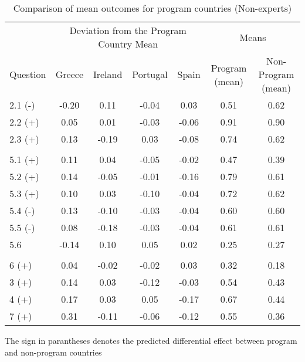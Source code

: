 
\begin{table}[htbp]\centering
\def\sym#1{\ifmmode^{#1}\else\(^{#1}\)\fi}
\caption{Comparison of mean outcomes for program countries (Non-experts)}
\begin{tabular}{l*{6}{c}}
\hline\hline
&\multicolumn{4}{c}{Deviation from the Program Country Mean} &\multicolumn{2}{c}{Means} \\
           Question &\multicolumn{1}{c}{Greece}&\multicolumn{1}{c}{Ireland}&\multicolumn{1}{c}{Portugal}&\multicolumn{1}{c}{Spain}&\multicolumn{1}{c}{Program (mean)}&\multicolumn{1}{c}{Non-Program (mean) }\\
  
\hline
2.1 (-)       &       -0.20&        0.11&       -0.04&        0.03&        0.51&        0.62\\
2.2 (+)        &        0.05&        0.01&       -0.03&       -0.06&        0.91&        0.90\\
2.3 (+)       &        0.13&       -0.19&        0.03&       -0.08&        0.74&        0.62\\
\hline
&&&&&& \\
5.1 (+)        &        0.11&        0.04&       -0.05&       -0.02&        0.47&        0.39\\
5.2 (+)        &        0.14&       -0.05&       -0.01&       -0.16&        0.79&        0.61\\
5.3 (+)        &        0.10&        0.03&       -0.10&       -0.04&        0.72&        0.62\\
5.4 (-)        &        0.13&       -0.10&       -0.03&       -0.04&        0.60&        0.60\\
5.5 (-)        &        0.08&       -0.18&       -0.03&       -0.04&        0.61&        0.61\\
5.6         &       -0.14&        0.10&        0.05&        0.02&        0.25&        0.27\\
\hline
&&&&&& \\
6  (+)         &        0.04&       -0.02&       -0.02&        0.03&        0.32&        0.18\\
3  (+)          &        0.14&        0.03&       -0.12&       -0.03&        0.54&        0.43\\
4  (+)          &        0.17&        0.03&        0.05&       -0.17&        0.67&        0.44\\
7  (+)          &        0.31&       -0.11&       -0.06&       -0.12&        0.55&        0.36\\
\hline\hline
\end{tabular}
\begin{tablenotes}
\item The sign in parantheses denotes the predicted differential effect between program and non-program countries 
\end{tablenotes}
\end{table}